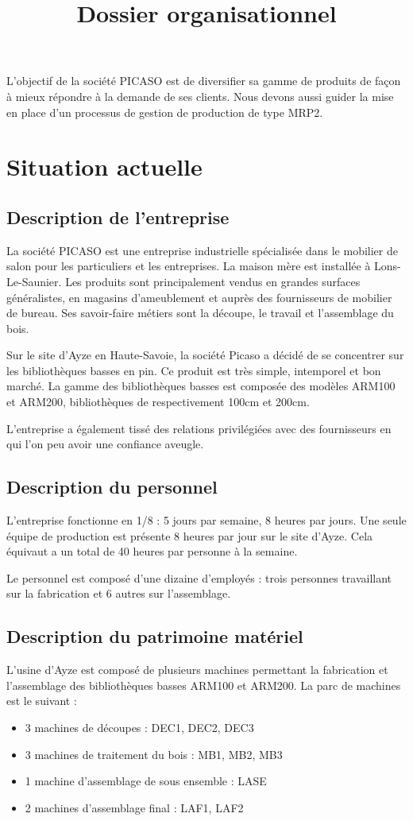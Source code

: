 \documentclass[a4paper]{../TPInsa}
\title{Dossier organisationnel}
\begin{document}
	\pageTitre
	\tableMatieres

		L'objectif de la société PICASO est de diversifier sa gamme de produits de façon à mieux répondre à la demande de ses clients. Nous devons aussi guider la mise en place d'un processus de gestion de production de type MRP2.	
	
	\section{Situation actuelle}
	
	\subsection{Description de l'entreprise}
	
	La société PICASO est une entreprise industrielle spécialisée dans le mobilier de salon pour les particuliers et les entreprises. La maison mère est installée à Lons-Le-Saunier. Les produits sont principalement vendus en grandes surfaces généralistes, en magasins d'ameublement et auprès des fournisseurs de mobilier de bureau. Ses savoir-faire métiers sont la découpe, le travail et l'assemblage du bois.
	
	Sur le site d'Ayze en Haute-Savoie, la société Picaso a décidé de se concentrer sur les bibliothèques basses en pin. Ce produit est très simple, intemporel et bon marché. La gamme des bibliothèques basses est composée des modèles ARM100 et ARM200, bibliothèques de respectivement 100cm et 200cm.  
	
	
	L'entreprise a également tissé des relations privilégiées avec des fournisseurs en qui l'on peu avoir une confiance aveugle. 
	
	\subsection{Description du personnel}
	L'entreprise fonctionne en 1/8 : 5 jours par semaine, 8 heures par jours. Une seule équipe de production est présente 8 heures par jour sur le site d'Ayze. Cela équivaut a un total de 40 heures par personne à la semaine. 
	
	Le personnel est composé d'une dizaine d'employés : trois personnes travaillant sur la fabrication et 6 autres sur l'assemblage. 
	\subsection{Description du patrimoine matériel}
	L'usine d'Ayze est composé de plusieurs machines permettant la fabrication et l'assemblage des bibliothèques basses ARM100 et ARM200. 
	La parc de machines est le suivant :
	\begin{itemize}
	\item 3 machines de découpes : DEC1, DEC2, DEC3
	\item 3 machines de traitement du bois : MB1, MB2, MB3
	\item 1 machine d'assemblage de sous ensemble : LASE
	\item 2 machines d'assemblage final : LAF1, LAF2
	\end{itemize}
	
\end{document}
